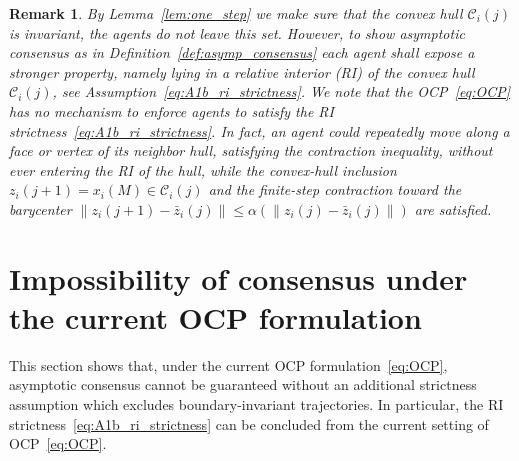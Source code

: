 \documentclass[12pt,draftcls,onecolumn]{IEEEtran}
\newtheorem{remark}{Remark}
\def\Cij{\mathcal{C}_i (j)}
\begin{document}
\begin{remark}\label{rem:need_for_strictness}
By Lemma~\ref{lem:one_step} we make sure that the convex hull $\Cij$ is invariant, the agents do not leave this set.
However, to show asymptotic consensus as in Definition~\ref{def:asymp_consensus} each agent shall expose a stronger property, namely lying in a relative interior (RI) of the convex hull $\Cij$, see Assumption~\ref{eq:A1b_ri_strictness}.
We note that the OCP~\eqref{eq:OCP} has no mechanism to enforce agents to satisfy the RI strictness~\ref{eq:A1b_ri_strictness}.
In fact, an agent could repeatedly move along a face or vertex of its neighbor hull, satisfying the contraction inequality, without ever entering the RI of the hull, while the convex-hull inclusion $z_i(j+1)=x_i(M)\in \Cij$ and the finite-step contraction toward the barycenter $\|z_i(j+1)-\bar z_i(j)\|\le \alpha(\|z_i(j)-\bar z_i(j)\|)$ are satisfied.
\end{remark}


\section{Impossibility of consensus under the current OCP formulation}\label{sec:impossibility}

This section shows that, under the current OCP formulation~\eqref{eq:OCP}, asymptotic consensus
cannot be guaranteed without an additional strictness assumption which excludes boundary-invariant trajectories. 
In particular, the RI strictness~\eqref{eq:A1b_ri_strictness} can be concluded from the current setting of OCP~\eqref{eq:OCP}.
\end{document}

